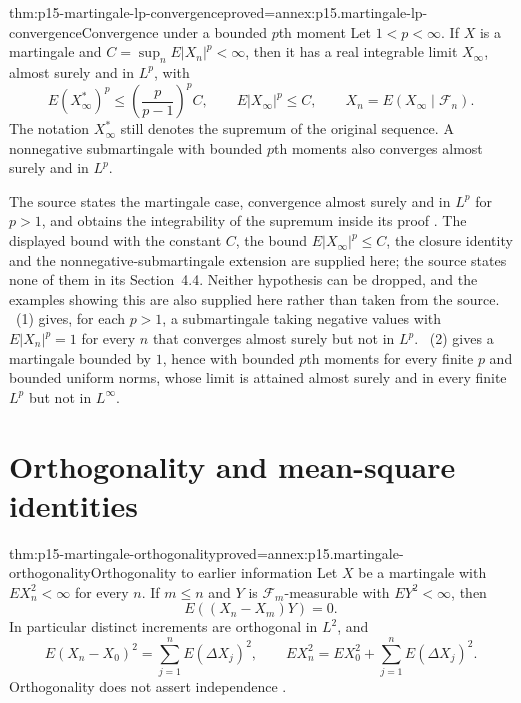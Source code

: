 \begin{hbtheorem}{thm:p15-martingale-lp-convergence}{proved=annex:p15.martingale-lp-convergence}{Convergence under a bounded \(p\)th moment}
Let \(1<p<\infty\). If \(X\) is a martingale and
\(C=\sup_nE|X_n|^p<\infty\), then it has a real integrable limit
\(X_\infty\), almost surely and in \(L^p\), with
\[
      E(X_\infty^*)^p\leq\left(\frac p{p-1}\right)^pC,\qquad
      E|X_\infty|^p\leq C,\qquad
      X_n=E(X_\infty\mid\mathcal F_n).
\]
The notation \(X_\infty^*\) still denotes the supremum of the original
sequence. A nonnegative submartingale with bounded \(p\)th moments
also converges almost surely and in \(L^p\).

The source states the martingale case, convergence almost surely and
in \(L^p\) for \(p>1\), and obtains the integrability of the supremum
inside its proof \cite[thm.~4.4.6, p.~237]{DurrettPTEAuthor2019}.
The displayed bound with the constant \(C\), the bound
\(E|X_\infty|^p\leq C\), the closure identity and the
nonnegative-submartingale extension are supplied here; the source
states none of them in its Section~4.4.
Neither hypothesis can be dropped, and the examples showing this are
also supplied here rather than taken from the source.
~(1) gives, for each
\(p>1\), a submartingale taking negative values with
\(E|X_n|^p=1\) for every \(n\) that converges almost surely but not in
\(L^p\). ~(2) gives a
martingale bounded by \(1\), hence with bounded \(p\)th moments for
every finite \(p\) and bounded uniform norms, whose limit is
attained almost surely and in every finite \(L^p\) but not in
\(L^\infty\).
\end{hbtheorem}

\section{Orthogonality and mean-square identities}
\label{sec:p15-martingale-l2-identities}

\begin{hbtheorem}{thm:p15-martingale-orthogonality}{proved=annex:p15.martingale-orthogonality}{Orthogonality to earlier information}
Let \(X\) be a martingale with \(EX_n^2<\infty\) for every \(n\).
If \(m\leq n\) and \(Y\) is \(\mathcal F_m\)-measurable with
\(EY^2<\infty\), then
\[
                            E((X_n-X_m)Y)=0.
\]
In particular distinct increments are orthogonal in \(L^2\), and
\[
       E(X_n-X_0)^2=\sum_{j=1}^nE(\Delta X_j)^2,\qquad
       EX_n^2=EX_0^2+\sum_{j=1}^nE(\Delta X_j)^2.
\]
Orthogonality does not assert independence
\cite[thm.~4.4.7]{DurrettPTEAuthor2019}.
\end{hbtheorem}

